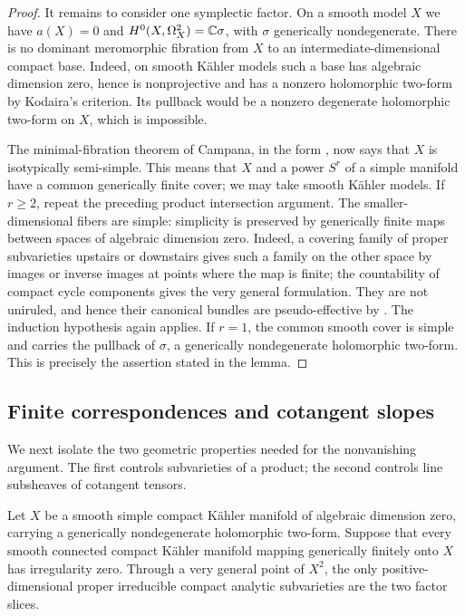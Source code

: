 \begin{proof}
It remains to consider one symplectic factor.  On a smooth model \(X\)
we have \(a(X)=0\) and \(H^0(X,\Omega_X^2)=\mathbb C\sigma\), with
\(\sigma\) generically nondegenerate.  There is no dominant meromorphic
fibration from \(X\) to an intermediate-dimensional compact base.
Indeed, on smooth Kähler models such a base has algebraic dimension
zero, hence is nonprojective and has a nonzero holomorphic two-form by
Kodaira's criterion.  Its pullback would be a nonzero degenerate
holomorphic two-form on \(X\), which is impossible.

The minimal-fibration theorem of Campana, in the form
\cite[Theorem~2.3(3) and Corollary~2.5(2)]{COP}, now says that \(X\)
is isotypically semi-simple.  This means that \(X\) and a power
\(S^r\) of a simple manifold have a common generically finite cover;
we may take smooth Kähler models.  If \(r\ge2\), repeat the preceding
product intersection argument.  The smaller-dimensional fibers are
simple: simplicity is preserved by generically finite maps between
spaces of algebraic dimension zero.  Indeed, a covering family of
proper subvarieties upstairs or downstairs gives such a family on the
other space by images or inverse images at points where the map is
finite; the countability of compact cycle components gives the very
general formulation.  They are not uniruled, and hence
their canonical bundles are pseudo-effective by \cite[Theorem~1.1]{Ou}.
The induction hypothesis again applies.  If \(r=1\), the common smooth
cover is simple and carries the pullback of \(\sigma\), a generically
nondegenerate holomorphic two-form.  This is precisely the assertion
stated in the lemma.
\end{proof}

\subsection{Finite correspondences and cotangent slopes}

We next isolate the two geometric properties needed for the
nonvanishing argument.  The first controls subvarieties of a product;
the second controls line subsheaves of cotangent tensors.

\begin{lemma}\label{zero:no-correspondences}
Let \(X\) be a smooth simple compact Kähler manifold of algebraic
dimension zero, carrying a generically nondegenerate holomorphic
two-form.  Suppose that every smooth connected compact Kähler manifold
mapping generically finitely onto \(X\) has irregularity zero.
Through a very general point of \(X^2\), the only positive-dimensional
proper irreducible compact analytic subvarieties are the two factor
slices.
\end{lemma}

